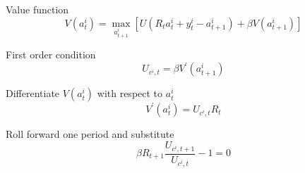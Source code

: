 \documentclass[notes=show]{beamer}
\begin{document}
\begin{frame}%


Value function%
\begin{equation*}
V(a_{t}^{i})=\underset{a_{t+1}^{i}}{\max }\left[
U(R_{t}a_{t}^{i}+y_{t}^{i}-a_{t+1}^{i})+\beta V(a_{t+1}^{i})\right]
\end{equation*}

First order condition 
\begin{equation*}
U_{c^{i},t}=\beta V^{\prime }(a_{t+1}^{i})
\end{equation*}

Differentiate $V(a_{t}^{i})$ with respect to $a_{t}^{i}$%
\begin{equation*}
V^{\prime }(a_{t}^{i})=U_{c^{i},t}R_{t}
\end{equation*}

Roll forward one period and substitute%
\begin{equation*}
\beta R_{t+1}\frac{U_{c^{i},t+1}}{U_{c^{i},t}}-1=0
\end{equation*}

\transboxout%
\end{frame}%
\end{document}

